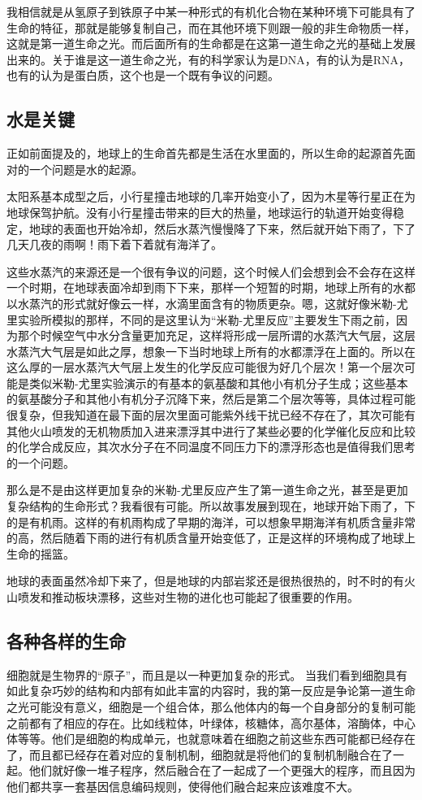 \documentclass[12pt]{exam}%
\begin{document}
我相信就是从氢原子到铁原子中某一种形式的有机化合物在某种环境下可能具有了生命的特征，那就是能够复制自己，而在其他环境下则跟一般的非生命物质一样，这就是第一道生命之光。而后面所有的生命都是在这第一道生命之光的基础上发展出来的。关于谁是这一道生命之光，有的科学家认为是DNA，有的认为是RNA，也有的认为是蛋白质，这个也是一个既有争议的问题。


\subsection{水是关键}
正如前面提及的，地球上的生命首先都是生活在水里面的，所以生命的起源首先面对的一个问题是水的起源。

太阳系基本成型之后，小行星撞击地球的几率开始变小了，因为木星等行星正在为地球保驾护航。没有小行星撞击带来的巨大的热量，地球运行的轨道开始变得稳定，地球的表面也开始冷却，然后水蒸汽慢慢降了下来，然后就开始下雨了，下了几天几夜的雨啊！雨下着下着就有海洋了。

这些水蒸汽的来源还是一个很有争议的问题，这个时候人们会想到会不会存在这样一个时期，在地球表面冷却到雨下下来，那样一个短暂的时期，地球上所有的水都以水蒸汽的形式就好像云一样，水滴里面含有的物质更杂。嗯，这就好像米勒-尤里实验所模拟的那样，不同的是这里认为“米勒-尤里反应”主要发生下雨之前，因为那个时候空气中水分含量更加充足，这样将形成一层所谓的水蒸汽大气层，这层水蒸汽大气层是如此之厚，想象一下当时地球上所有的水都漂浮在上面的。所以在这么厚的一层水蒸汽大气层上发生的化学反应可能很为好几个层次！第一个层次可能是类似米勒-尤里实验演示的有基本的氨基酸和其他小有机分子生成；这些基本的氨基酸分子和其他小有机分子沉降下来，然后是第二个层次等等，具体过程可能很复杂，但我知道在最下面的层次里面可能紫外线干扰已经不存在了，其次可能有其他火山喷发的无机物质加入进来漂浮其中进行了某些必要的化学催化反应和比较的化学合成反应，其次水分子在不同温度不同压力下的漂浮形态也是值得我们思考的一个问题。

那么是不是由这样更加复杂的米勒-尤里反应产生了第一道生命之光，甚至是更加复杂结构的生命形式？我看很有可能。所以故事发展到现在，地球开始下雨了，下的是有机雨。这样的有机雨构成了早期的海洋，可以想象早期海洋有机质含量非常的高，然后随着下雨的进行有机质含量开始变低了，正是这样的环境构成了地球上生命的摇篮。

地球的表面虽然冷却下来了，但是地球的内部岩浆还是很热很热的，时不时的有火山喷发和推动板块漂移，这些对生物的进化也可能起了很重要的作用。



\subsection{各种各样的生命}
细胞就是生物界的“原子”，而且是以一种更加复杂的形式。 当我们看到细胞具有如此复杂巧妙的结构和内部有如此丰富的内容时，我的第一反应是争论第一道生命之光可能没有意义，细胞是一个组合体，那么他体内的每一个自身部分的复制可能之前都有了相应的存在。比如线粒体，叶绿体，核糖体，高尔基体，溶酶体，中心体等等。他们是细胞的构成单元，也就意味着在细胞之前这些东西可能都已经存在了，而且都已经存在着对应的复制机制，细胞就是将他们的复制机制融合在了一起。他们就好像一堆子程序，然后融合在了一起成了一个更强大的程序，而且因为他们都共享一套基因信息编码规则，使得他们融合起来应该难度不大。
\end{document}
